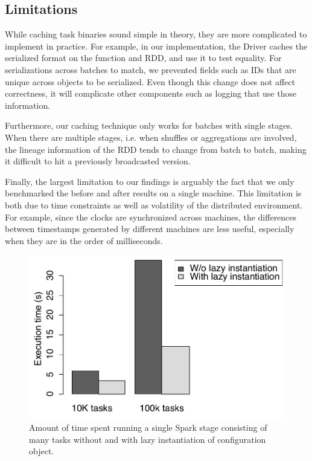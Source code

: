 \subsection{Limitations}
While caching task binaries sound simple in theory, they are more complicated to implement in practice. For example, in our implementation, the Driver caches the serialized format on the function and RDD, and use it to test equality. For serializations across batches to match, we prevented fields such as IDs that are unique across objects to be serialized. Even though this change does not affect correctness, it will complicate other components such as logging that use those information.

Furthermore, our caching technique only works for batches with single stages. When there are multiple stages, i.e. when shuffles or aggregations are involved, the lineage information of the RDD tends to change from batch to batch, making it difficult to hit a previously broadcasted version.

Finally, the largest limitation to our findings is arguably the fact that we only benchmarked the before and after results on a single machine. This limitation is both due to time constraints as well as volatility of the distributed environment. For example, since the clocks are synchronized across machines, the differences between timestamps generated by different machines are less useful, especially when they are in the order of milliseconds.

\begin{figure}[t!]
 \begin{center}
   \includegraphics[scale=0.50]{images_graphs/optimizations/graph1/lazy_micro.pdf}
 \end{center}
 \caption{Amount of time spent running a single Spark stage consisting of many tasks without and with lazy instantiation of configuration object.}
 \label{fig:lazy_micro}
\end{figure}

